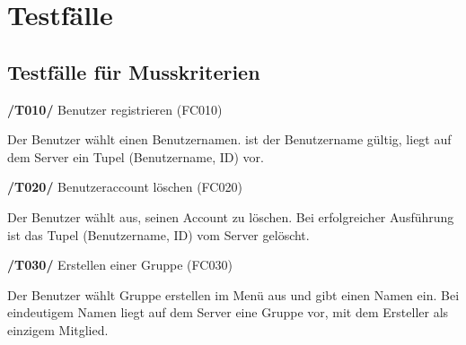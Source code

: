 \section{Testfälle}
\subsection{Testfälle für Musskriterien}
\textbf{/T010/} Benutzer registrieren (FC010) \\
\begin{itemize}
Der Benutzer wählt einen Benutzernamen.
ist der Benutzername gültig, liegt auf dem Server ein Tupel (Benutzername, ID) vor.
\end{itemize}

\textbf{/T020/} Benutzeraccount löschen (FC020) \\
\begin{itemize}
Der Benutzer wählt aus, seinen Account zu löschen.
Bei erfolgreicher Ausführung ist das Tupel (Benutzername, ID) vom Server gelöscht.
\end{itemize}

\textbf{/T030/} Erstellen einer Gruppe (FC030)\\
\begin{itemize}
Der Benutzer wählt Gruppe erstellen im Menü aus und gibt einen Namen ein.
Bei eindeutigem Namen liegt auf dem Server eine Gruppe vor, mit dem Ersteller als einzigem Mitglied.
\end{itemize}

